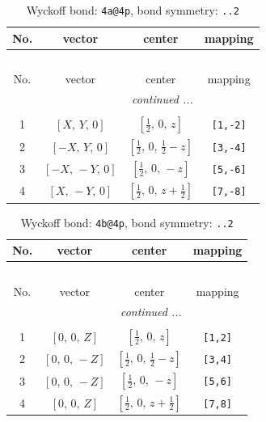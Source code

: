 \documentclass[fleqn,8pt]{jsarticle}
\begin{document}
\begin{longtable}{cccc}
\caption{Wyckoff bond: {\tt 4a@4p}, bond symmetry: {\tt ..2}}
 \\
 \hline \hline
No. & vector & center & mapping \\ \hline \endfirsthead

\multicolumn{3}{l}{\tablename\ \thetable{}} \\
 \hline \hline
No. & vector & center & mapping \\ \hline \endhead

 \hline \hline
\multicolumn{3}{r}{\footnotesize\it continued ...} \\ \endfoot

 \hline \hline
\multicolumn{3}{r}{} \\ \endlastfoot

1 & $\left[ X,\, Y,\, 0 \right]$ & $\left[ \frac{1}{2},\, 0,\, z \right]$ & {\tt [1,-2]} \\ \hline
2 & $\left[ - X,\, Y,\, 0 \right]$ & $\left[ \frac{1}{2},\, 0,\, \frac{1}{2} - z \right]$ & {\tt [3,-4]} \\ \hline
3 & $\left[ - X,\, - Y,\, 0 \right]$ & $\left[ \frac{1}{2},\, 0,\, - z \right]$ & {\tt [5,-6]} \\ \hline
4 & $\left[ X,\, - Y,\, 0 \right]$ & $\left[ \frac{1}{2},\, 0,\, z + \frac{1}{2} \right]$ & {\tt [7,-8]} \\
\end{longtable}
\renewcommand{\arraystretch}{1.2}
\begin{longtable}{cccc}
\caption{Wyckoff bond: {\tt 4b@4p}, bond symmetry: {\tt ..2}}
 \\
 \hline \hline
No. & vector & center & mapping \\ \hline \endfirsthead

\multicolumn{3}{l}{\tablename\ \thetable{}} \\
 \hline \hline
No. & vector & center & mapping \\ \hline \endhead

 \hline \hline
\multicolumn{3}{r}{\footnotesize\it continued ...} \\ \endfoot

 \hline \hline
\multicolumn{3}{r}{} \\ \endlastfoot

1 & $\left[ 0,\, 0,\, Z \right]$ & $\left[ \frac{1}{2},\, 0,\, z \right]$ & {\tt [1,2]} \\ \hline
2 & $\left[ 0,\, 0,\, - Z \right]$ & $\left[ \frac{1}{2},\, 0,\, \frac{1}{2} - z \right]$ & {\tt [3,4]} \\ \hline
3 & $\left[ 0,\, 0,\, - Z \right]$ & $\left[ \frac{1}{2},\, 0,\, - z \right]$ & {\tt [5,6]} \\ \hline
4 & $\left[ 0,\, 0,\, Z \right]$ & $\left[ \frac{1}{2},\, 0,\, z + \frac{1}{2} \right]$ & {\tt [7,8]} \\
\end{longtable}
\end{document}
